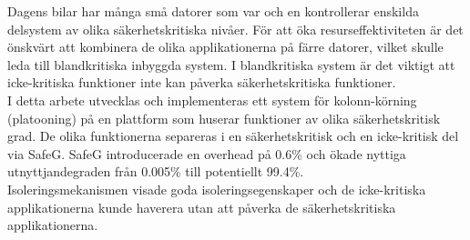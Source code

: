 
Dagens bilar har många små datorer som var och en kontrollerar enskilda delsystem av olika säkerhetskritiska nivåer. För att öka resurseffektiviteten är det önskvärt att kombinera de olika applikationerna på färre datorer, vilket skulle leda till blandkritiska inbyggda system. I blandkritiska system är det viktigt att icke-kritiska funktioner inte kan påverka säkerhetskritiska funktioner.\\

I detta arbete utvecklas och implementeras ett system för kolonn-körning (platooning) på en plattform som huserar funktioner av olika säkerhetskritisk grad. De olika funktionerna separeras i en säkerhetskritisk och en icke-kritisk del via SafeG. SafeG introducerade en overhead på 0.6\% och ökade nyttiga utnyttjandegraden från 0.005\% till potentiellt 99.4\%.\\

Isoleringsmekanismen visade goda isoleringsegenskaper och de icke-kritiska applikationerna kunde haverera utan att påverka de säkerhetskritiska applikationerna.

\vspace{0.25cm}
